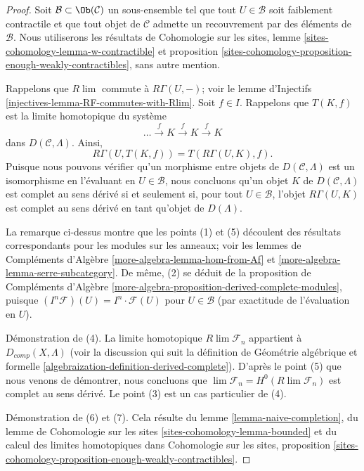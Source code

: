 \begin{proof}
Soit $\mathcal{B} \subset \Ob(\mathcal{C})$ un sous-ensemble tel que tout
$U \in \mathcal{B}$ soit faiblement contractile et que tout objet de $\mathcal{C}$
admette un recouvrement par des éléments de $\mathcal{B}$.
Nous utiliserons les résultats de Cohomologie sur les sites,
lemme \ref{sites-cohomology-lemma-w-contractible} et
proposition \ref{sites-cohomology-proposition-enough-weakly-contractibles},
sans autre mention.

\medskip\noindent
Rappelons que $R\lim$ commute à $R\Gamma(U, -)$;
voir le lemme d'Injectifs \ref{injectives-lemma-RF-commutes-with-Rlim}.
Soit $f \in I$. Rappelons que $T(K, f)$ est la limite homotopique
du système
$$
\ldots \xrightarrow{f} K \xrightarrow{f} K \xrightarrow{f} K
$$
dans $D(\mathcal{C}, \Lambda)$. Ainsi,
$$
R\Gamma(U, T(K, f)) = T(R\Gamma(U, K), f).
$$
Puisque nous pouvons vérifier qu'un morphisme entre objets de
$D(\mathcal{C}, \Lambda)$ est un isomorphisme en l'évaluant en $U \in \mathcal{B}$,
nous concluons qu'un objet $K$ de $D(\mathcal{C}, \Lambda)$
est complet au sens dérivé si et seulement si, pour tout $U \in \mathcal{B}$,
l'objet $R\Gamma(U, K)$ est complet au sens dérivé en tant qu'objet de $D(\Lambda)$.

\medskip\noindent
La remarque ci-dessus montre que les points (1) et (5) découlent des résultats correspondants
pour les modules sur les anneaux; voir les
lemmes de Compléments d'Algèbre \ref{more-algebra-lemma-hom-from-Af} et
\ref{more-algebra-lemma-serre-subcategory}.
De même, (2) se déduit de la
proposition de Compléments d'Algèbre
\ref{more-algebra-proposition-derived-complete-modules},
puisque $(I^n\mathcal{F})(U) = I^n \cdot \mathcal{F}(U)$
pour $U \in \mathcal{B}$ (par exactitude de l'évaluation en $U$).

\medskip\noindent
Démonstration de (4). La limite homotopique $R\lim \mathcal{F}_n$ appartient à
$D_{comp}(X, \Lambda)$ (voir la discussion qui suit la
définition de Géométrie algébrique et formelle
\ref{algebraization-definition-derived-complete}).
D'après le point (5) que nous venons de démontrer, nous concluons que
$\lim \mathcal{F}_n = H^0(R\lim \mathcal{F}_n)$
est complet au sens dérivé.
Le point (3) est un cas particulier de (4).

\medskip\noindent
Démonstration de (6) et (7). Cela résulte du
lemme \ref{lemma-naive-completion},
du
lemme de Cohomologie sur les sites \ref{sites-cohomology-lemma-bounded}
et du calcul des limites homotopiques dans Cohomologie sur les sites,
proposition \ref{sites-cohomology-proposition-enough-weakly-contractibles}.
\end{proof}







